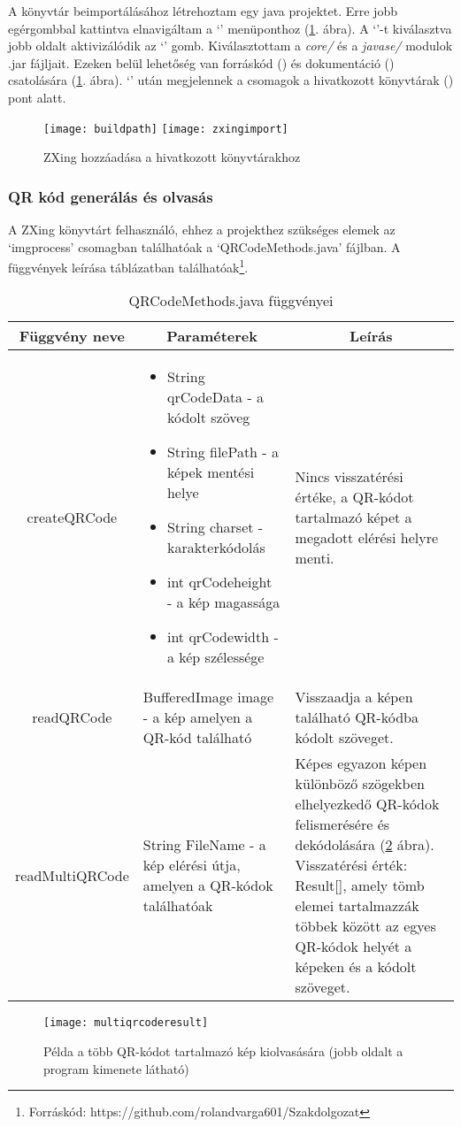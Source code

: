\documentclass[../documentation.tex]{subfiles}
\begin{document}
A könyvtár beimportálásához létrehoztam egy java projektet. Erre jobb egérgombbal kattintva elnavigáltam a `' menüponthoz (\ref{fig:zxingimport}. ábra). A `'-t kiválasztva jobb oldalt aktivizálódik az `' gomb. Kiválasztottam a \textit{core/} és a \textit{javase/} modulok .jar fájljait. Ezeken belül lehetőség van forráskód () és dokumentáció () csatolására (\ref{fig:zxingimport}. ábra). `' után megjelennek a csomagok a hivatkozott könyvtárak () pont alatt.

\begin{figure}[h]
\centering
\texttt{[image: buildpath]}
\texttt{[image: zxingimport]}
\caption{ZXing hozzáadása a hivatkozott könyvtárakhoz}
\label{fig:zxingimport}
\end{figure}

\subsubsection{QR kód generálás és olvasás}
A ZXing könyvtárt felhasználó, ehhez a projekthez szükséges elemek az `imgprocess' csomagban találhatóak a `QRCodeMethods.java' fájlban. A függvények leírása   táblázatban találhatóak\footnote{Forráskód: https://github.com/rolandvarga601/Szakdolgozat}. 

\begin{table}[h]
\centering
\renewcommand\tabularxcolumn[1]{m{#1}}%
\begin{tabularx}{\linewidth}{|c|X|X|}
\hline \multicolumn{1}{|c|}{\textbf{Függvény neve}} & \multicolumn{1}{c|}{\textbf{Paraméterek}} & \multicolumn{1}{c|}{\textbf{Leírás}}\tabularnewline \hline
createQRCode & 
\begin{itemize} \item String qrCodeData - a kódolt szöveg
					\item String filePath - a képek mentési helye
					\item String charset - karakterkódolás
					\item int qrCodeheight - a kép magassága
					\item int qrCodewidth - a kép szélessége
\end{itemize} & Nincs visszatérési értéke, a QR-kódot tartalmazó képet a megadott elérési helyre menti. \tabularnewline \hline
readQRCode & BufferedImage image - a kép amelyen a QR-kód található & Visszaadja a képen található QR-kódba kódolt szöveget. \tabularnewline \hline
readMultiQRCode & String FileName - a kép elérési útja, amelyen a QR-kódok találhatóak & Képes egyazon képen különböző szögekben elhelyezkedő QR-kódok felismerésére és dekódolására (\ref{fig:multiqrcoderead} ábra). Visszatérési érték: Result[], amely tömb elemei tartalmazzák többek között az egyes QR-kódok helyét a képeken és a kódolt szöveget. \tabularnewline \hline
\end{tabularx}
\caption{QRCodeMethods.java függvényei}
\label{tab:qrcodemethods}
\end{table}

\begin{figure}[h]
\centering
{}
\texttt{[image: multiqrcoderesult]}
\caption{Példa a több QR-kódot tartalmazó kép kiolvasására (jobb oldalt a program kimenete látható)}
\label{fig:multiqrcoderead}
\end{figure}
\end{document}
